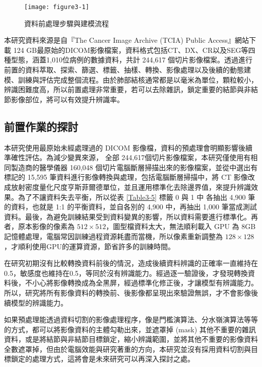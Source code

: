 \documentclass[12pt, a4paper]{article} 				%
\begin{document}
\begin{figure}[!ht]
\begin{center}
\texttt{[image: figure3-1]}
\caption{資料前處理步驟與建模流程}\label{Figure3-1}
\end{center}
\end{figure}

本研究資料來源是自『The Cancer Image Archive (TCIA) Public Access』網站下載 124 GB最原始的DICOM影像檔案，資料格式包括CT、DX、CR以及SEG等四種型態，涵蓋1,010位病例的數據資料，共計 244,617 個切片影像檔案。透過進行前置的資料萃取、探索、篩選、標籤、抽樣、轉換、影像處理以及後續的動態建模、訓練與評估完成整個流程。由於肺部結核通常都是以毫米為單位，顆粒較小，辨識困難度高，所以前置處理非常重要，若可以去除雜訊，鎖定重要的結節與非結節影像部位，將可以有效提升辨識率。

\subsection{前置作業的探討}
本研究使用最原始未經處理過的 DICOM 影像檔，資料的預處理會明顯影響後續準確性評估。為減少變異來源， 全部 244,617個切片影像檔案，本研究僅使用有相同製造商的醫學儀器 160,048 個切片電腦斷層掃描出來的影像檔案，並從中選出有標記的 15,595 筆資料進行影像轉換與處理，包括電腦斷層掃描中，將 CT 影像改成放射密度量化尺度亨斯菲爾德單位，並且運用標準化去除邊界值，來提升辨識效果。為了不讓資料失去平衡，所以從表 \ref{Table3-5} 標籤 0 與 1 中 各抽出 4,900 筆的資料，也就是 1:1 的平衡資料，並自各別的 4,900 中，再抽出 1,000 筆當成測試資料。最後，為避免訓練結果受到資料變異的影響，所以資料需要進行標準化。再者，原本影像的像素為 $512\times 512$，圖型檔資料太大，無法順利載入 GPU 為 8GB 記憶體處理，電腦常因訓練過程資源耗盡而當機，所以像素重新調整為 $128\times 128$，才順利使用GPU的運算資源，節省許多的訓練時間。

在研究初期沒有比較轉換資料前後的情況，造成後續資料辨識的正確率一直維持在0.5，敏感度也維持在0.5，等同於沒有辨識能力。經過逐一驗證後，才發現轉換資料後，不小心將影像轉換成為全黑屏，經過標準化修正後，才讓模型有辨識能力。所以，研究將所有影像資料的轉換前、後影像都呈現出來驗證無誤，才不會影像後續模型的辨識能力。

如果預處理能透過資料切割的影像處理程序，像是門檻演算法、分水嶺演算法等等的方式，都可以將影像資料的主體勾勒出來，並遮罩掉 (mask) 其他不重要的雜訊資料，或是將結節與非結節目標鎖定，縮小辨識範圍，並將其他不重要的影像資料全數遮罩掉，但由於電腦效能與研究著重的方向，本研究並沒有採用資料切割與目標鎖定的處理方式，這將會是未來研究可以再深入探討之處。
\end{document}
